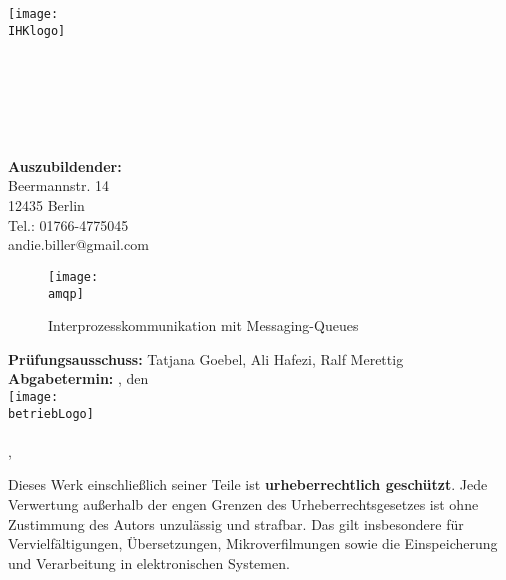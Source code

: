 \begin{titlepage}

\begin{center}
\texttt{[image: \\IHKlogo]}\\[0.5ex]
\Large{\ausbildungsberuf}\\
\LARGE{\betreff}\\
\huge{\textbf{\titelOne\\\titelTwo}}\\[0.5ex]
\Large{\textbf{\untertitelOne}}\\
\Large{\textbf{\untertitelTwo}}\\[1.5ex]

\normalsize
\textbf{Auszubildender:} \autorName\\
Beermannstr. 14\\
12435 Berlin\\
Tel.: 01766-4775045\\
andie.biller@gmail.com\\

\begin{figure}[htb]
    \centering
    \texttt{[image: \\amqp]}\\[0.65ex]
    \caption{Interprozesskommunikation mit Messaging-Queues}
    \label{fig:redHatCom}
\end{figure}

\textbf{Prüfungsausschuss:} Tatjana Goebel, Ali Hafezi, Ralf Merettig\\
\textbf{Abgabetermin:} \abgabeOrt{}, den \abgabeTermin\\[3ex]

\texttt{[image: \\betriebLogo]}\\
\betriebName{}\\
\betriebAnschrift{}, \betriebOrt\\[2.5ex]
\end{center}

\small
\noindent
Dieses Werk einschließlich seiner Teile ist \textbf{urheberrechtlich geschützt}.
Jede Verwertung außerhalb der engen Grenzen des Urheberrechtsgesetzes ist ohne Zustimmung des Autors unzulässig und strafbar.
Das gilt insbesondere für Vervielfältigungen, Übersetzungen, Mikroverfilmungen sowie die Einspeicherung und Verarbeitung in elektronischen Systemen.

\end{titlepage}

